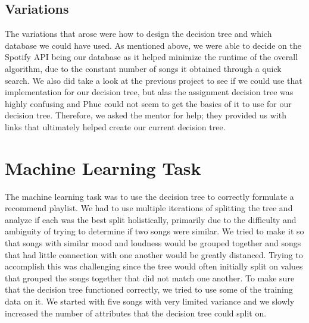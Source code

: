 \documentclass[]{report}
\begin{document}
	\subsection{Variations}
	The variations that arose were how to design the decision tree and which database we could have used. As mentioned above, we were able to decide on the Spotify API being our database as it helped minimize the runtime of the overall algorithm, due to the constant number of songs it obtained through a quick search. We also did take a look at the previous project to see if we could use that implementation for our decision tree, but alas the assignment decision tree was highly confusing and Phuc could not seem to get the basics of it to use for our decision tree. Therefore, we asked the mentor for help; they provided us with links that ultimately helped create our current decision tree.
	
	\section{Machine Learning Task}  
	The machine learning task was to use the decision tree to correctly formulate a recommend playlist. We had to use multiple iterations of splitting the tree and analyze if each was the best split holistically, primarily due to the difficulty and ambiguity of trying to determine if two songs were similar. We tried to make it so that songs with similar mood and loudness would be grouped together and songs that had little connection with one another would be greatly distanced. Trying to accomplish this was challenging since the tree would often initially split on values that grouped the songs together that did not match one another. To make sure that the decision tree functioned correctly, we tried to use some of the training data on it. We started with five songs with very limited variance and we slowly increased the number of attributes that the decision tree could split on.
	
\end{document}
